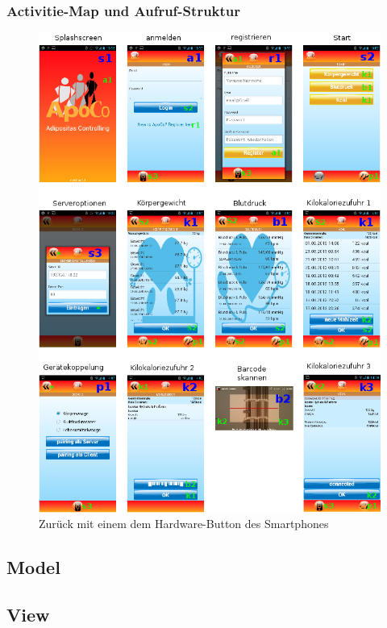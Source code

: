 \subsubsection{Activitie-Map und Aufruf-Struktur}

\begin{figure}[h]
  \centering
  \includegraphics[scale=0.35]{diagramme/kapitel4/activity_map.png}
  \caption{Zur\"uck mit einem dem Hardware-Button des Smartphones}
  
\end{figure}


\subsection{Model}

\subsection{View}
